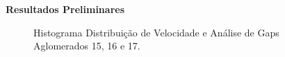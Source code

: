 \documentclass[xcolor=dvipsnames,10pt]{beamer}
\begin{document}
\begin{frame}{\textbf{Resultados Preliminares}}
\begin{figure}[!htbp]
    \caption{Histograma Distribuição de Velocidade e Análise de Gaps Aglomerados 15, 16 e 17.}
  \end{figure}
\end{frame}
\end{document}
